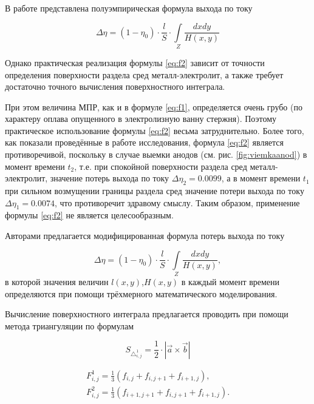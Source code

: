 \documentclass[]{pmi}
\begin{document}
В работе \cite{litlink:derkach2} представлена полуэмпирическая формула выхода по току

\begin{equation} \label{eq:f2}
\Delta \eta = (1- \eta_0) \cdot \frac{l}{S} \cdot \int\limits_Z \frac{dxdy}{H(x,y)}
\end{equation}

Однако практическая реализация формулы \ref{eq:f2} зависит от точности определения поверхности раздела сред металл-электролит, а также требует достаточно точного вычисления поверхностного интеграла. 

При этом величина МПР, как и в формуле \ref{eq:f1}, определяется очень грубо (по характеру оплава опущенного в электролизную ванну стержня). Поэтому практическое использование формулы \ref{eq:f2} весьма затруднительно. Более того, как показали проведённые в работе исследования, формула \ref{eq:f2} является противоречивой, поскольку в случае выемки анодов (см. рис. \ref{fig:viemkaanod}) в момент времени $t_2$, т.е. при спокойной поверхности раздела сред металл-электролит, значение  потерь выхода по току $\Delta\eta_2 = 0.0099$, а в момент времени $t_1$ при сильном возмущении границы раздела сред значение потери выхода по току $\Delta\eta_1 = 0.0074$, что противоречит здравому смыслу.  Таким образом, применение формулы \ref{eq:f2} не является целесообразным.

Авторами предлагается модифицированная формула потерь выхода по току 

\begin{equation} \label{eq:modf2}
\Delta \eta = (1- \eta_0) \cdot \frac{l}{S} \cdot \int\limits_Z \frac{dxdy}{H(x,y)},
\end{equation}
в которой значения величин $l(x,y)$,$ H(x,y)$ в каждый момент времени определяются при помощи трёхмерного математического моделирования.

Вычисление поверхностного интеграла предлагается проводить при помощи метода триангуляции по формулам 

\begin{equation}
{S_{\triangle_{i,j}^1}} = \frac{1}{2} \cdot |\overrightarrow{a} \times \overrightarrow{b}|
\end{equation} \label{eq:triangsquare}

\begin{align}
F^1_{i,j} = \frac{1}{3}(f_{i,j}+f_{i,j+1}+f_{i+1,j}), \label{eq:triangf1}\\
F^2_{i,j} = \frac{1}{3}(f_{i+1,j+1}+f_{i,j+1}+f_{i+1,j}). \label{eq:triangf2}
\end{align}
\end{document}

